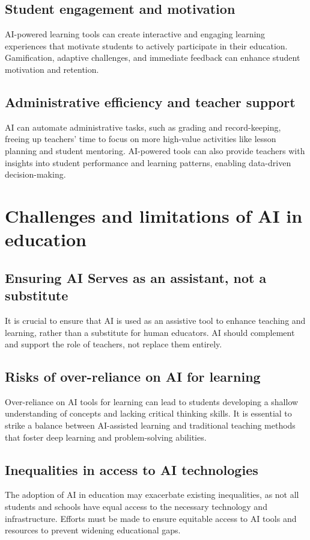 \documentclass{article}
\begin{document}
\subsection{Student engagement and motivation}
AI-powered learning tools can create interactive and engaging learning experiences that motivate students to actively participate in their education. Gamification, adaptive challenges, and immediate feedback can enhance student motivation and retention.

\subsection{Administrative efficiency and teacher support}
AI can automate administrative tasks, such as grading and record-keeping, freeing up teachers' time to focus on more high-value activities like lesson planning and student mentoring. AI-powered tools can also provide teachers with insights into student performance and learning patterns, enabling data-driven decision-making.

\section{Challenges and limitations of AI in education}

\subsection{Ensuring AI Serves as an assistant, not a substitute}
It is crucial to ensure that AI is used as an assistive tool to enhance teaching and learning, rather than a substitute for human educators. AI should complement and support the role of teachers, not replace them entirely.

\subsection{Risks of over-reliance on AI for learning}
Over-reliance on AI tools for learning can lead to students developing a shallow understanding of concepts and lacking critical thinking skills. It is essential to strike a balance between AI-assisted learning and traditional teaching methods that foster deep learning and problem-solving abilities.

\subsection{Inequalities in access to AI technologies}
The adoption of AI in education may exacerbate existing inequalities, as not all students and schools have equal access to the necessary technology and infrastructure. Efforts must be made to ensure equitable access to AI tools and resources to prevent widening educational gaps.
\end{document}
